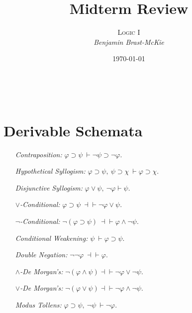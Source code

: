 \documentclass[a4paper, 11pt]{article} %
\title{\textbf{Midterm Review}} %
\author{\textsc{Logic I}\\ \em Benjamin Brast-McKie} %
\date{\today} %
\makeatletter
\renewcommand{\maketitle}{ %
\begin{flushright} %
{\LARGE\@title} %

\vspace{10pt} %

{\@author} %
\\\@date %

\vspace{30pt} %
\end{flushright}
}
\makeatother
\begin{document}
\maketitle %

\thispagestyle{empty}


\section*{Derivable Schemata}

\begin{enumerate}[leftmargin=1.5in]
  \item[\it Contraposition:] $\varphi \supset \psi\ \vdash \neg\psi \supset \neg\varphi$.
  \item[\it Hypothetical Syllogism:] $\varphi \supset \psi,\ \psi \supset \chi\ \vdash \varphi \supset \chi$.
  \item[\it Disjunctive Syllogism:] $\varphi \vee \psi,\ \neg \varphi \vdash \psi$.
  \item[\it $\vee$-Conditional:] $\varphi \supset \psi\ \dashv\vdash \neg\varphi \vee \psi$.
  \item[\it $\neg$-Conditional:] $\neg(\varphi \supset \psi)\ \dashv\vdash \varphi \wedge \neg \psi$.
  \item[\it Conditional Weakening:] $\psi\ \vdash \varphi \supset \psi$.
  \item[\it Double Negation:] $\neg\neg\varphi\ \dashv\vdash \varphi$.
  \item[\it $\wedge$-De Morgan's:] $\neg(\varphi\wedge\psi)\dashv\vdash\neg\varphi\vee\neg\psi$.
  \item[\it $\vee$-De Morgan's:] $\neg(\varphi\vee\psi)\dashv\vdash\neg\varphi\wedge\neg\psi$.
  \item[\it Modus Tollens:] $\varphi \supset \psi,\ \neg\psi\ \vdash \neg\varphi$.

\end{enumerate}
\end{document}
